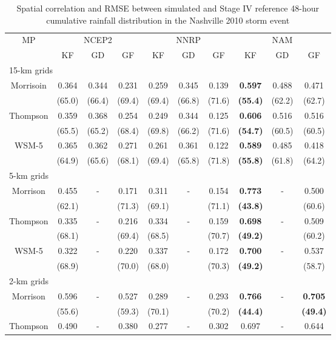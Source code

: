 \begin{table}[htbp]
	\centering
	\caption{Spatial correlation and RMSE between simulated and Stage IV reference 48-hour cumulative rainfall distribution in the Nashville 2010 storm event}
	\begin{threeparttable}
		\begin{tabular}{cccccccccc}
		\hline
		\multirow{2}{*}{MP} & \multicolumn{3}{c}{NCEP2} & \multicolumn{3}{c}{NNRP} & \multicolumn{3}{c}{NAM}\\
		\cline{2-10}
		& KF & GD & GF & KF & GD & GF & KF & GD & GF\\
		\hline
		\multicolumn{10}{l}{15-km grids}\\
		Morrisoin & 0.364 &0.344 &0.231 &0.259 &0.345 &0.139 & \textbf{0.597} &0.488 &0.471\\
		&(65.0) &(66.4) &(69.4) &(69.4) &(66.8)  &(71.6) &\textbf{(55.4)} &(62.2) &(62.7)\\
		Thompson & 0.359 &0.368 &0.254 &0.249 &0.344 &0.125 &\textbf{0.606} &0.516 &0.516\\
		&(65.5) &(65.2) &(68.4) &(69.8) &(66.2) &(71.6) &\textbf{(54.7)} &(60.5) &(60.5)\\
		WSM-5 &  0.365 & 0.362 & 0.271 & 0.261 & 0.361 & 0.122 & \textbf{0.589} & 0.485 & 0.418\\
		& (64.9) & (65.6) & (68.1) & (69.4) & (65.8) & (71.8) & \textbf{(55.8)} & (61.8) & (64.2)\\
		\hline
		\multicolumn{10}{l}{5-km grids}\\
		Morrison & 0.455 & - & 0.171 & 0.311 & - & 0.154 & \textbf{0.773} & - & 0.500\\
		& (62.1) && (71.3) & (69.1) && (71.1) & \textbf{(43.8)} && (60.6)\\
		Thompson & 0.335 & - & 0.216 & 0.334 & - & 0.159 & \textbf{0.698} & - & 0.509\\
		& (68.1) && (69.4) & (68.5) && (70.7) & \textbf{(49.2)} && (60.2)\\
		WSM-5 & 0.322 & - & 0.220 & 0.337 & - & 0.172 & \textbf{0.700} & - & 0.537\\
		& (68.9) && (70.0) & (68.0) && (70.3) & \textbf{(49.2)} && (58.7)\\
		\hline
		\multicolumn{10}{l}{2-km grids}\\
		Morrison & 0.596 & - & 0.527 & 0.289 & - & 0.293 & \textbf{0.766} & - & \textbf{0.705}\\
		& (55.6) & & (59.3) & (70.1) & & (70.2) & \textbf{(44.4)} & & \textbf{(49.4)}\\
		Thompson & 0.490 & - & 0.380 & 0.277 & - & 0.302 & 0.697 & - & 0.644\\

\end{tabular}
\end{threeparttable}
\end{table}
